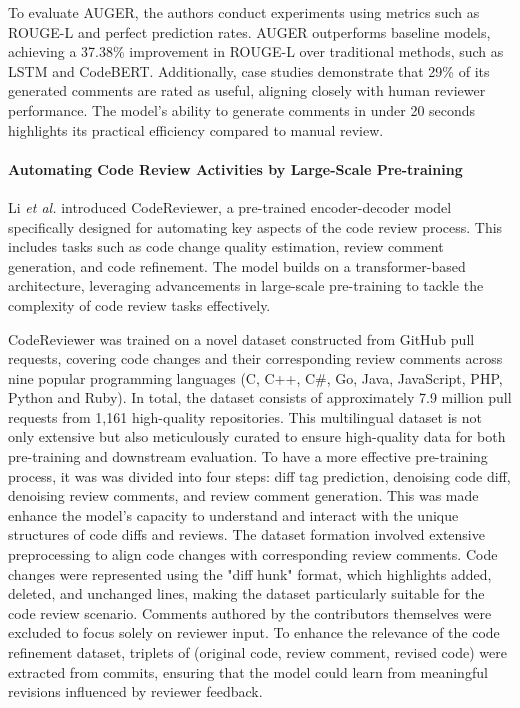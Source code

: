 To evaluate AUGER, the authors conduct experiments using metrics such as
ROUGE-L and perfect prediction rates. AUGER outperforms baseline models,
achieving a 37.38\% improvement in ROUGE-L over traditional methods, such as
LSTM and CodeBERT. Additionally, case studies demonstrate that 29\% of its
generated comments are rated as useful, aligning closely with human reviewer
performance. The model's ability to generate comments in under 20 seconds
highlights its practical efficiency compared to manual review.

\paragraph{Automating Code Review Activities by Large-Scale Pre-training}

Li \emph{et al.} \cite{li.l:esecfse2022} introduced CodeReviewer, a pre-trained
encoder-decoder model specifically designed for automating key aspects of the
code review process. This includes tasks such as code change quality
estimation, review comment generation, and code refinement. The model builds on
a transformer-based architecture, leveraging advancements in large-scale
pre-training to tackle the complexity of code review tasks effectively.

CodeReviewer was trained on a novel dataset constructed from GitHub pull
requests, covering code changes and their corresponding review comments across
nine popular programming languages (C, C++, C\#, Go, Java, JavaScript, PHP,
Python and Ruby). In total, the dataset consists of approximately 7.9 million
pull requests from 1,161 high-quality repositories. This multilingual dataset
is not only extensive but also meticulously curated to ensure high-quality data
for both pre-training and downstream evaluation. To have a more effective
pre-training process, it was was divided into four steps: diff tag prediction,
denoising code diff, denoising review comments, and review comment generation.
This was made enhance the model's capacity to understand and interact with the
unique structures of code diffs and reviews. The dataset formation involved
extensive preprocessing to align code changes with corresponding review
comments. Code changes were represented using the "diff hunk" format, which
highlights added, deleted, and unchanged lines, making the dataset particularly
suitable for the code review scenario. Comments authored by the contributors
themselves were excluded to focus solely on reviewer input. To enhance the
relevance of the code refinement dataset, triplets of (original code, review
comment, revised code) were extracted from commits, ensuring that the model
could learn from meaningful revisions influenced by reviewer feedback.

